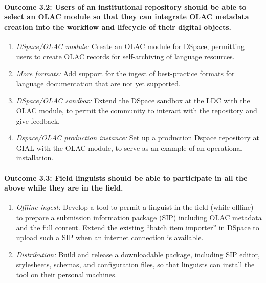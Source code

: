 \def\task{3.2}
\paragraph{Outcome {\task}: Users of an institutional repository should be
    able to select an OLAC module so that they can integrate OLAC
    metadata creation into the workflow and lifecycle of their
    digital objects.}

\begin{enumerate}[label=\emph{\task\alph*}]\setlength{\itemsep}{0pt}
\item \emph{DSpace/OLAC module:}
  Create an OLAC module for DSpace, permitting users to create OLAC
  records for self-archiving of language resources.
\item \emph{More formats:}
  Add support for the ingest of best-practice formats for language
  documentation that are not yet supported.
\item \emph{DSpace/OLAC sandbox:}
  Extend the DSpace sandbox at the LDC with the OLAC module,
  to permit the community to interact with the repository and give feedback.
\item \emph{Dspace/OLAC production instance:}
  Set up a production Dspace repository at GIAL with the OLAC module, to serve
  as an example of an operational installation. 
\end{enumerate}

\def\task{3.3}
\paragraph{Outcome {\task}: Field linguists should be able to participate in all the
    above while they are in the field.}

\begin{enumerate}[label=\emph{\task\alph*}]\setlength{\itemsep}{0pt}
\item \emph{Offline ingest:}
  Develop a tool to permit a linguist in the field (while offline) to
  prepare a submission information package (SIP) including OLAC
  metadata and the full content. 
  Extend the existing ``batch item importer'' in DSpace to 
  upload such a SIP when an internet connection is available.
\item \emph{Distribution:}
  Build and release a downloadable package, including SIP editor,
  stylesheets, schemas, and configuration files, so that linguists
  can install the tool on their personal machines.
\end{enumerate}

